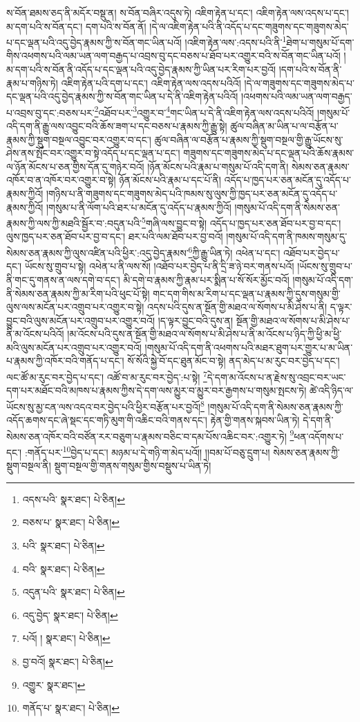 ས་བོན་ཐམས་ཅད་ནི་མདོར་བསྡུ་ན། ས་བོན་བཞིར་འདུས་ཏེ། འཇིག་རྟེན་པ་དང་། འཇིག་རྟེན་ལས་འདས་པ་དང་། མ་དག་པའི་ས་བོན་དང་། དག་པའི་ས་བོན་ནོ། །དེ་ལ་འཇིག་རྟེན་པའི་ནི་འདོད་པ་དང་གཟུགས་དང་གཟུགས་མེད་པ་དང་ལྡན་པའི་འདུ་བྱེད་རྣམས་ཀྱི་ས་བོན་གང་ཡིན་པའོ། །འཇིག་རྟེན་ལས་:འདས་པའི་ནི་\footnote{འདས་པའི་  སྣར་ཐང་།  པེ་ཅིན། }ཐེག་པ་གསུམ་པོ་དག་གིས་འཕགས་པའི་ལམ་ཡན་ལག་བརྒྱད་པ་འབྲས་བུ་དང་བཅས་པ་ཐོབ་པར་འགྱུར་བའི་ས་བོན་གང་ཡིན་པའོ། །མ་དག་པའི་ས་བོན་ནི་འདོད་པ་དང་ལྡན་པའི་འདུ་བྱེད་རྣམས་ཀྱི་ཡིན་པར་རིག་པར་བྱའོ། །དག་པའི་ས་བོན་ནི་རྣམ་པ་གཉིས་ཏེ། འཇིག་རྟེན་པའི་དག་པ་དང་། འཇིག་རྟེན་ལས་འདས་པའིའོ། །དེ་ལ་གཟུགས་དང་གཟུགས་མེད་པ་དང་ལྡན་པའི་འདུ་བྱེད་རྣམས་ཀྱི་ས་བོན་གང་ཡིན་པ་དེ་ནི་འཇིག་རྟེན་པའིའོ། །འཕགས་པའི་ལམ་ཡན་ལག་བརྒྱད་པ་འབྲས་བུ་དང་:བཅས་པར་\footnote{བཅས་པ་  སྣར་ཐང་།  པེ་ཅིན། }འཐོབ་པར་\footnote{པའི་  སྣར་ཐང་།  པེ་ཅིན། }འགྱུར་བ་\footnote{བའི་  སྣར་ཐང་།  པེ་ཅིན། }གང་ཡིན་པ་དེ་ནི་འཇིག་རྟེན་ལས་འདས་པའིའོ། །གསུམ་པོ་འདི་དག་ནི་རྒྱུ་ལས་འབྱུང་བའི་ཆོས་ཟག་པ་དང་བཅས་པ་རྣམས་ཀྱི་རྒྱུ་སྟེ། ཚུལ་བཞིན་མ་ཡིན་པ་ལ་བརྩོན་པ་རྣམས་ཀྱི་སྡུག་བསྔལ་འབྱུང་བར་འགྱུར་བ་དང་། ཚུལ་བཞིན་ལ་བརྩོན་པ་རྣམས་ཀྱི་སྡུག་བསྔལ་གྱི་རྒྱུ་ཡོངས་སུ་ཤེས་ནས་སྤོང་བར་འགྱུར་བ་སྟེ་འདོད་པ་དང་ལྡན་པ་དང་། གཟུགས་དང་གཟུགས་མེད་པ་དང་ལྡན་པའི་ཆོས་རྣམས་ལ་ཉོན་མོངས་པ་ཅན་གྱིས་དོན་དུ་གཉེར་བའོ། །ཉོན་མོངས་པའི་རྣམ་པ་གསུམ་པོ་འདི་དག་ནི། སེམས་ཅན་རྣམས་འཁོར་བ་ན་འཁོར་བར་འགྱུར་བ་སྟེ། ཉོན་མོངས་པའི་རྣམ་པ་དང་པོ་ནི། འདོད་པ་ཁྱད་པར་ཅན་མངོན་དུ་འདོད་པ་རྣམས་ཀྱིའོ། །གཉིས་པ་ནི་གཟུགས་དང་གཟུགས་མེད་པའི་ཁམས་སུ་ལུས་ཀྱི་ཁྱད་པར་ཅན་མངོན་དུ་འདོད་པ་རྣམས་ཀྱིའོ། །གསུམ་པ་ནི་ལོག་པའི་ཐར་པ་མངོན་དུ་འདོད་པ་རྣམས་ཀྱིའོ། །གསུམ་པོ་འདི་དག་ནི་སེམས་ཅན་རྣམས་ཀྱི་ལས་ཀྱི་མཐའི་སྦྱོར་བ་:བདུན་པའི་\footnote{འདུན་པའི་  སྣར་ཐང་།  པེ་ཅིན། }གཞི་ལས་བྱུང་བ་སྟེ། འདོད་པ་ཁྱད་པར་ཅན་ཐོབ་པར་བྱ་བ་དང་། ལུས་ཁྱད་པར་ཅན་ཐོབ་པར་བྱ་བ་དང་། ཐར་པའི་ལམ་ཐོབ་པར་བྱ་བའོ། །གསུམ་པོ་འདི་དག་ནི་ཁམས་གསུམ་དུ་སེམས་ཅན་རྣམས་ཀྱི་ལུས་འཛིན་པའི་ཕྱིར་:འདུ་བྱེད་རྣམས་\footnote{འདུ་བྱེད་  སྣར་ཐང་།  པེ་ཅིན། }ཀྱི་རྒྱུ་ཡིན་ཏེ། འཕེན་པ་དང་། འཐོབ་པར་བྱེད་པ་དང་། ཡོངས་སུ་གྲུབ་པ་སྟེ། འཕེན་པ་ནི་ལས་སོ། །འཐོབ་པར་བྱེད་པ་ནི་དྲི་ཟ་ཉེ་བར་གནས་པའོ། །ཡོངས་སུ་གྲུབ་པ་ནི་གང་དུ་གནས་ན་ལས་དགེ་བ་དང་། མི་དགེ་བ་རྣམས་ཀྱི་རྣམ་པར་སྨིན་པ་སོ་སོར་མྱོང་བའོ། །གསུམ་པོ་འདི་དག་ནི་སེམས་ཅན་རྣམས་ཀྱི་མ་རིག་པའི་ཕུང་པོ་སྟེ། གང་དག་གིས་མ་རིག་པ་དང་ལྡན་པ་རྣམས་ཀྱི་དུས་གསུམ་གྱི་ལུས་ལས་མངོན་པར་འགྲུབ་པར་འགྱུར་བ་སྟེ། འདས་པའི་དུས་ན་སྔོན་གྱི་མཐའ་ལ་སོགས་པ་མི་ཤེས་པ་ནི། ད་ལྟར་བྱུང་བའི་ལུས་མངོན་པར་འགྲུབ་པར་འགྱུར་བའོ། །ད་ལྟར་བྱུང་བའི་དུས་ན། སྔོན་གྱི་མཐའ་ལ་སོགས་པ་མི་ཤེས་པ་ནི་མ་འོངས་པའིའོ། །མ་འོངས་པའི་དུས་ན་སྔོན་གྱི་མཐའ་ལ་སོགས་པ་མི་ཤེས་པ་ནི་མ་འོངས་པ་ཉིད་ཀྱི་ཕྱི་མ་ཕྱི་མའི་ལུས་མངོན་པར་འགྲུབ་པར་འགྱུར་བའོ། །གསུམ་པོ་འདི་དག་ནི་འཕགས་པའི་མཐར་ཐུག་པར་གྱུར་པ་མ་ཡིན་པ་རྣམས་ཀྱི་འཁོར་བའི་གནོད་པ་དང་། སོ་སོའི་སྐྱེ་བོ་དང་ཐུན་མོང་བ་སྟེ། ནད་མེད་པ་མ་རུང་བར་བྱེད་པ་དང་། ལང་ཚོ་མ་རུང་བར་བྱེད་པ་དང་། འཚོ་བ་མ་རུང་བར་བྱེད་:པ་སྟེ། \footnote{པའོ། །   སྣར་ཐང་།  པེ་ཅིན། }དེ་དག་མ་འོངས་པ་ན་རྗེས་སུ་འབྲང་བར་ཡང་དག་པར་མཐོང་བའི་མཁས་པ་རྣམས་ཀྱིས་དེ་དག་ལས་མྱུར་བ་མྱུར་བར་རྒྱགས་པ་གསུམ་སྤངས་ཏེ། ཚེ་འདི་ཉིད་ལ་ཡོངས་སུ་མྱ་ངན་ལས་འདའ་བར་བྱེད་པའི་ཕྱིར་བརྩོན་པར་བྱའོ།\footnote{བྱ་བའོ།  སྣར་ཐང་།  པེ་ཅིན། } །གསུམ་པོ་འདི་དག་ནི་སེམས་ཅན་རྣམས་ཀྱི་འདོད་ཆགས་དང་ཞེ་སྡང་དང་གཏི་མུག་གི་འཆིང་བའི་གནས་དང་། རྟེན་གྱི་གནས་སྐབས་ཡིན་ཏེ། དེ་དག་ནི་སེམས་ཅན་འཁོར་བའི་བཙོན་རར་བཅུག་པ་རྣམས་བཅིང་བ་དམ་པོས་འཆིང་བར་:འགྱུར་ཏེ། \footnote{འགྱུར་  སྣར་ཐང་། }ཕན་འདོགས་པ་དང་། :གནོད་པར་\footnote{གནོད་པ་  སྣར་ཐང་།  པེ་ཅིན། }བྱེད་པ་དང་། མཉམ་པ་དེ་གཉི་ག་མེད་པའོ།། །།བམ་པོ་བཅུ་དྲུག་པ། སེམས་ཅན་རྣམས་ཀྱི་སྡུག་བསྔལ་ནི། སྡུག་བསྔལ་གྱི་གནས་གསུམ་གྱིས་བསྡུས་པ་ཡིན་ཏེ། 